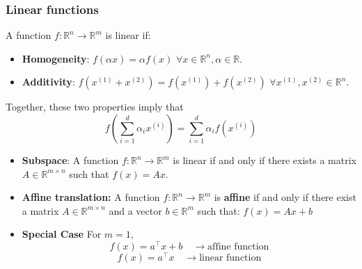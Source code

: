 \begin{example}
\end{example}

\begin{example}
\end{example}

    \subsubsection{Linear functions}
    \begin{definition}
        A function $f: \mathbb{R}^n \to \mathbb{R}^m$ is linear if:
        \begin{itemize}
            \item \textbf{Homogeneity}: $f(\alpha x) = \alpha f(x)$ \quad $\forall x \in \mathbb{R}^n, \alpha \in \mathbb{R}$.
            \item \textbf{Additivity}: $f(x^{(1)} + x^{(2)}) = f(x^{(1)}) + f(x^{(2)})$ \quad $\forall x^{(1)}, x^{(2)} \in \mathbb{R}^n$.
        \end{itemize}
        \vspace{1em}

        Together, these two properties imply that
        \[
        f\left( \sum_{i=1}^{d} \alpha_i x^{(i)} \right) = \sum_{i=1}^{d} \alpha_i f(x^{(i)})
        \]
        \begin{itemize}
            \item \textbf{Subspace}: A function $f: \mathbb{R}^n \to \mathbb{R}^m$ is linear if and only if there exists a matrix $A \in \mathbb{R}^{m \times n}$ such that $f(x) = Ax$.
            \item \textbf{Affine translation:} A function $f: \mathbb{R}^n \to \mathbb{R}^m$ is \textbf{affine} if and only if there exist a matrix $A \in \mathbb{R}^{m \times n}$ and a vector $b \in \mathbb{R}^m$ such that: $f(x) = Ax + b$
            \item \textbf{Special Case} For $m = 1$, 
            \[
            f(x) = a^\top x + b \quad \rightarrow \text{affine function}
            \]
            \[
            f(x) = a^\top x \quad \rightarrow \text{linear function}
            \]
        \end{itemize}
    \end{definition}

    \begin{example}
    \end{example}


